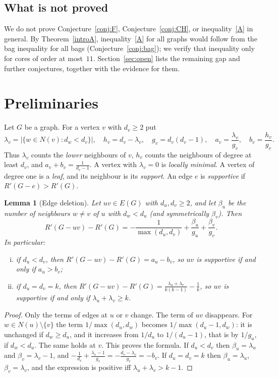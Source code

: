 \documentclass[11pt]{amsart}
\newtheorem{lemma}[theorem]{Lemma}
\theoremstyle{definition}
\newcommand{\Rp}{R'}
\newcommand{\kmax}{11}
\begin{document}
\subsection*{What is not proved}
We do not prove Conjecture~\ref{conj:F}, Conjecture~\ref{conj:CH}, or inequality~\eqref{A} in general. By
Theorem~\ref{introA}, inequality~\eqref{A} for all graphs would follow from the bag inequality for all bags
(Conjecture~\ref{conj:bag}); we verify that inequality only for cores of order at most~$\kmax$. Section~\ref{sec:open}
lists the remaining gap and further conjectures, together with the evidence for them.

\section{Preliminaries}\label{sec:prelim}

Let $G$ be a graph. For a vertex $v$ with $d_v\ge2$ put
\[
\lambda_v=|\{w\in N(v):d_w<d_v\}|,\quad h_v=d_v-\lambda_v,\quad g_v=d_v(d_v-1),\quad
a_v=\frac{\lambda_v}{g_v},\quad b_v=\frac{h_v}{g_v}.
\]
Thus $\lambda_v$ counts the \emph{lower} neighbours of $v$, $h_v$ counts the neighbours of degree at least $d_v$,
and $a_v+b_v=\frac1{d_v-1}$. A vertex with $\lambda_v=0$ is \emph{locally minimal}. A vertex of degree one is a
\emph{leaf}, and its neighbour is its \emph{support}. An edge $e$ is \emph{supportive} if $\Rp(G-e)>\Rp(G)$.

\begin{lemma}[Edge deletion]\label{lem:edge}
Let $uv\in E(G)$ with $d_u,d_v\ge2$, and let $\beta_u$ be the number of neighbours $w\neq v$ of $u$ with $d_w<d_u$
(and symmetrically $\beta_v$). Then
\[
\Rp(G-uv)-\Rp(G)=-\frac1{\max(d_u,d_v)}+\frac{\beta_u}{g_u}+\frac{\beta_v}{g_v}.
\]
In particular:
\begin{enumerate}[(i)]
\item if $d_u<d_v$, then $\Rp(G-uv)-\Rp(G)=a_u-b_v$, so $uv$ is supportive if and only if $a_u>b_v$;
\item if $d_u=d_v=k$, then $\Rp(G-uv)-\Rp(G)=\frac{\lambda_u+\lambda_v}{k(k-1)}-\frac1k$, so $uv$ is supportive if and
only if $\lambda_u+\lambda_v\ge k$.
\end{enumerate}
\end{lemma}

\begin{proof}
Only the terms of edges at $u$ or $v$ change. The term of $uv$ disappears. For $w\in N(u)\setminus\{v\}$ the term
$1/\max(d_u,d_w)$ becomes $1/\max(d_u-1,d_w)$: it is unchanged if $d_w\ge d_u$, and it increases from $1/d_u$ to
$1/(d_u-1)$, that is by $1/g_u$, if $d_w<d_u$. The same holds at $v$. This proves the formula. If $d_u<d_v$ then
$\beta_u=\lambda_u$ and $\beta_v=\lambda_v-1$, and $-\frac1{d_v}+\frac{\lambda_v-1}{g_v}=-\frac{d_v-\lambda_v}{g_v}=-b_v$.
If $d_u=d_v=k$ then $\beta_u=\lambda_u$, $\beta_v=\lambda_v$, and the expression is positive iff
$\lambda_u+\lambda_v>k-1$.
\end{proof}
\end{document}
